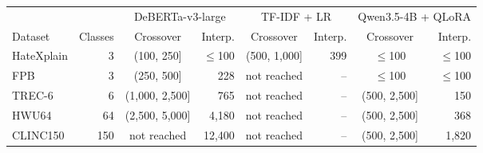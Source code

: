 \begin{tabular}{lrcrcrcr}
\toprule
 & & \multicolumn{2}{c}{DeBERTa-v3-large} & \multicolumn{2}{c}{TF-IDF + LR} & \multicolumn{2}{c}{Qwen3.5-4B + QLoRA} \\
\cmidrule(lr){3-4} \cmidrule(lr){5-6} \cmidrule(lr){7-8}
Dataset & Classes & Crossover & Interp. & Crossover & Interp. & Crossover & Interp. \\
\midrule
HateXplain & 3 & (100, 250] & $\le$100 & (500, 1{,}000] & 399 & $\le$100 & $\le$100 \\
FPB & 3 & (250, 500] & 228 & not reached & -- & $\le$100 & $\le$100 \\
TREC-6 & 6 & (1{,}000, 2{,}500] & 765 & not reached & -- & (500, 2{,}500] & 150 \\
HWU64 & 64 & (2{,}500, 5{,}000] & 4{,}180 & not reached & -- & (500, 2{,}500] & 368 \\
CLINC150 & 150 & not reached & 12{,}400 & not reached & -- & (500, 2{,}500] & 1{,}820 \\
\bottomrule
\end{tabular}
